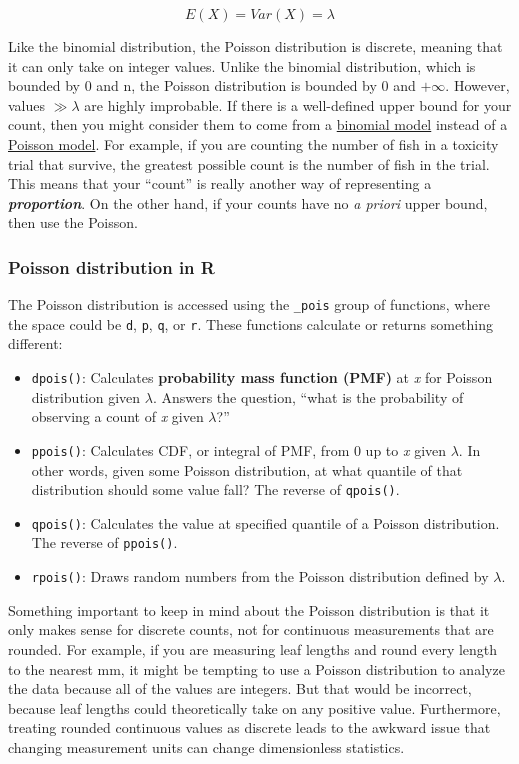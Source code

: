 \documentclass[
  13,
  letterpaper,
]{report}
\providecommand{\tightlist}{%
  \setlength{\itemsep}{0pt}\setlength{\parskip}{0pt}}
\begin{document}
\[E\left(X\right)=Var\left(X\right)=\lambda\]

Like the binomial distribution, the Poisson distribution is discrete,
meaning that it can only take on integer values. Unlike the binomial
distribution, which is bounded by 0 and n, the Poisson distribution is
bounded by 0 and \(+\infty\). However, values \(\gg \lambda\) are highly
improbable. If there is a well-defined upper bound for your count, then
you might consider them to come from a \href{@sec-glm4-binom}{binomial
model} instead of a \href{@sec-18-poisson}{Poisson model}. For example,
if you are counting the number of fish in a toxicity trial that survive,
the greatest possible count is the number of fish in the trial. This
means that your ``count'' is really another way of representing a
\textbf{\emph{proportion}}. On the other hand, if your counts have no
\emph{a priori} upper bound, then use the Poisson.

\subsubsection{Poisson distribution in R}\label{sec-dist-pois-r}

The Poisson distribution is accessed using the \texttt{\_pois} group of
functions, where the space could be \texttt{d}, \texttt{p}, \texttt{q},
or \texttt{r}. These functions calculate or returns something different:

\begin{itemize}
\tightlist
\item
  \texttt{dpois()}: Calculates \textbf{probability mass function (PMF)}
  at \emph{x} for Poisson distribution given \(\lambda\). Answers the
  question, ``what is the probability of observing a count of \emph{x}
  given \(\lambda\)?''
\item
  \texttt{ppois()}: Calculates CDF, or integral of PMF, from 0 up to
  \emph{x} given \(\lambda\). In other words, given some Poisson
  distribution, at what quantile of that distribution should some value
  fall? The reverse of \texttt{qpois()}.
\item
  \texttt{qpois()}: Calculates the value at specified quantile of a
  Poisson distribution. The reverse of \texttt{ppois()}.
\item
  \texttt{rpois()}: Draws random numbers from the Poisson distribution
  defined by \(\lambda\).
\end{itemize}

Something important to keep in mind about the Poisson distribution is
that it only makes sense for discrete counts, not for continuous
measurements that are rounded. For example, if you are measuring leaf
lengths and round every length to the nearest mm, it might be tempting
to use a Poisson distribution to analyze the data because all of the
values are integers. But that would be incorrect, because leaf lengths
could theoretically take on any positive value. Furthermore, treating
rounded continuous values as discrete leads to the awkward issue that
changing measurement units can change dimensionless statistics.
\end{document}
